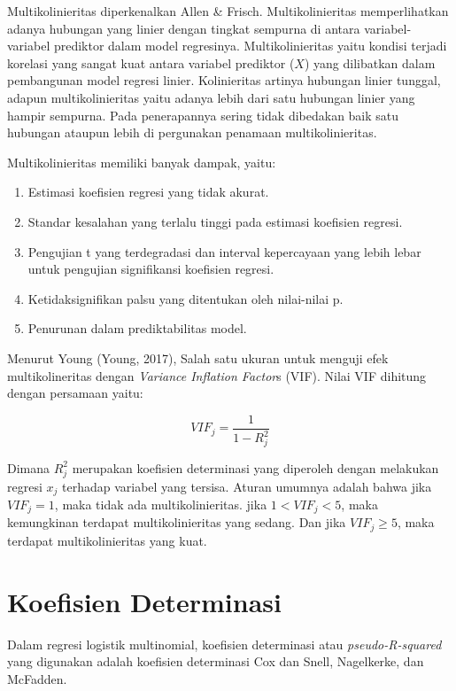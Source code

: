 Multikolinieritas diperkenalkan Allen \& Frisch\citep*{Allen1935}.
Multikolinieritas memperlihatkan adanya hubungan yang linier dengan
tingkat sempurna di antara variabel-variabel prediktor dalam model
regresinya. Multikolinieritas yaitu kondisi terjadi korelasi yang sangat
kuat antara variabel prediktor (\(X\)) yang dilibatkan dalam pembangunan
model regresi linier. Kolinieritas artinya hubungan linier tunggal,
adapun multikolinieritas yaitu adanya lebih dari satu hubungan linier
yang hampir sempurna. Pada penerapannya sering tidak dibedakan baik satu
hubungan ataupun lebih di pergunakan penamaan multikolinieritas.

Multikolinieritas memiliki banyak dampak, yaitu:


\begin{enumerate}
\def\labelenumi{\arabic{enumi}.}
\item
Estimasi koefisien regresi yang tidak akurat.
\item
Standar kesalahan yang terlalu tinggi pada estimasi koefisien regresi.
\item
Pengujian t yang terdegradasi dan interval kepercayaan yang lebih
lebar untuk pengujian signifikansi koefisien regresi.
\item
Ketidaksignifikan palsu yang ditentukan oleh nilai-nilai p.
\item
Penurunan dalam prediktabilitas model.
\end{enumerate}

Menurut Young (Young, 2017), Salah satu ukuran untuk menguji efek
multikolineritas dengan \emph{Variance Inflation Factor}s (VIF). Nilai
VIF dihitung dengan persamaan yaitu:

%
\begin{equation}\label{VIF}
    VIF_{j} = \frac{1}{1 - R_{j}^{2}}
\end{equation}

Dimana \(R_{j}^{2}\) merupakan koefisien determinasi yang diperoleh
dengan melakukan regresi \(x_{j}\) terhadap variabel yang tersisa.
Aturan umumnya adalah bahwa jika \(VIF_{j} = 1\), maka tidak ada
multikolinieritas. jika \(1 < VIF_{j} < 5\), maka kemungkinan terdapat
multikolinieritas yang sedang. Dan jika \(VIF_{j} \geq 5\), maka
terdapat multikolinieritas yang kuat.

\section{Koefisien Determinasi}
Dalam regresi logistik multinomial, koefisien determinasi atau
\emph{pseudo-R-squared} yang digunakan adalah koefisien determinasi Cox
dan Snell, Nagelkerke, dan McFadden.


